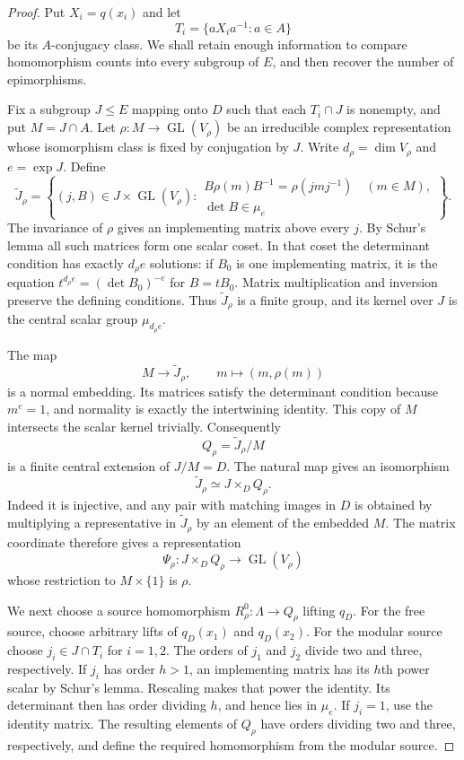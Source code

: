 \begin{proof}
Put $X_i=q(x_i)$ and let
\[
 T_i=\{aX_ia^{-1}:a\in A\}
\]
be its $A$-conjugacy class. We shall retain enough information to
compare homomorphism counts into every subgroup of $E$, and then
recover the number of epimorphisms.

Fix a subgroup $J\leq E$ mapping onto $D$ such that each $T_i\cap J$
is nonempty, and put $M=J\cap A$. Let
$\rho:M\to\operatorname{GL}(V_\rho)$ be an irreducible complex
representation whose isomorphism class is fixed by conjugation by $J$.
Write $d_\rho=\dim V_\rho$ and $e=\exp J$. Define
\[
 \widetilde J_\rho=
 \left\{(j,B)\in J\times\operatorname{GL}(V_\rho):
 \begin{array}{l}
 B\rho(m)B^{-1}=\rho(jmj^{-1})\quad(m\in M),\\
 \det B\in\mu_e
 \end{array}\right\}.
\]
The invariance of $\rho$ gives an implementing matrix above every $j$.
By Schur's lemma all such matrices form one scalar coset. In that
coset the determinant condition has exactly $d_\rho e$ solutions:
if $B_0$ is one implementing matrix, it is the equation
$t^{d_\rho e}=(\det B_0)^{-e}$ for $B=tB_0$. Matrix multiplication
and inversion preserve the defining conditions. Thus
$\widetilde J_\rho$ is a finite group, and its kernel over $J$ is
the central scalar group $\mu_{d_\rho e}$.

The map
\[
 M\longrightarrow\widetilde J_\rho,
 \qquad m\longmapsto(m,\rho(m))
\]
is a normal embedding. Its matrices satisfy the determinant condition
because $m^e=1$, and normality is exactly the intertwining identity.
This copy of $M$ intersects the scalar kernel trivially. Consequently
\[
 Q_\rho=\widetilde J_\rho/M
\]
is a finite central extension of $J/M=D$. The natural map gives an
isomorphism
\begin{equation}
 \widetilde J_\rho\simeq J\times_DQ_\rho.
 \label{eq:representation-fibre-product}
\end{equation}
Indeed it is injective, and any pair with matching images in $D$ is
obtained by multiplying a representative in $\widetilde J_\rho$ by
an element of the embedded $M$. The matrix coordinate therefore gives
a representation
\[
 \Psi_\rho:J\times_DQ_\rho
        \longrightarrow\operatorname{GL}(V_\rho)
\]
whose restriction to $M\times\{1\}$ is $\rho$.

We next choose a source homomorphism
$R_\rho^0:\Lambda\to Q_\rho$ lifting $q_D$. For the free source,
choose arbitrary lifts of $q_D(x_1)$ and $q_D(x_2)$. For the modular
source choose $j_i\in J\cap T_i$ for $i=1,2$. The orders of $j_1$
and $j_2$ divide two and three, respectively. If $j_i$ has order
$h>1$, an implementing matrix has its $h$th power scalar by Schur's
lemma. Rescaling makes that power the identity. Its determinant then
has order dividing $h$, and hence lies in $\mu_e$. If $j_i=1$, use
the identity matrix. The resulting elements of $Q_\rho$ have orders
dividing two and three, respectively, and define the required
homomorphism from the modular source.


\end{proof}
